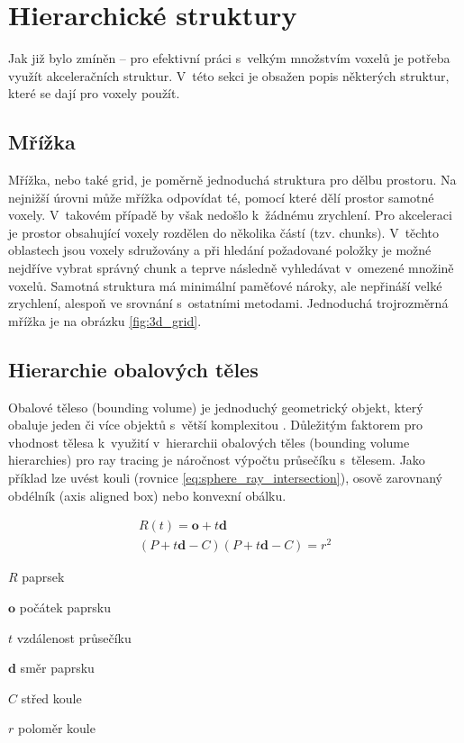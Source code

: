 \section{Hierarchické struktury}
Jak již bylo zmíněn -- pro efektivní práci s~velkým množstvím voxelů je potřeba využít akceleračních struktur. V~této sekci je obsažen popis některých struktur, které se dají pro voxely použít.

\subsection{Mřížka}
Mřížka, nebo také grid, je poměrně jednoduchá struktura pro dělbu prostoru. Na nejnižší úrovni může mřížka odpovídat té, pomocí které dělí prostor samotné voxely. V~takovém případě by však nedošlo k~žádnému zrychlení. Pro akceleraci je prostor obsahující voxely rozdělen do několika částí (tzv. chunks). V~těchto oblastech jsou voxely sdružovány a při hledání požadované položky je možné nejdříve vybrat správný chunk a teprve následně vyhledávat v~omezené množině voxelů. Samotná struktura má minimální paměťové nároky, ale nepřináší velké zrychlení, alespoň ve srovnání s~ostatními metodami. Jednoduchá trojrozměrná mřížka je na obrázku \ref{fig:3d_grid}.

\subsection{Hierarchie obalových těles} \label{sec:BVH}
Obalové těleso (bounding volume) je jednoduchý geometrický objekt, který obaluje jeden či více objektů s~větší komplexitou \cite{ericson_2005}. Důležitým faktorem pro vhodnost tělesa k~využití v~hierarchii obalových těles (bounding volume hierarchies) pro ray tracing je náročnost výpočtu průsečíku s~tělesem. Jako příklad lze uvést kouli (rovnice \ref{eq:sphere_ray_intersection}), osově zarovnaný obdélník (axis aligned box) nebo konvexní obálku.

\begin{equation} \label{eq:sphere_ray_intersection}
	\begin{gathered}
	    R(t) = \textbf{o} + t\textbf{d}  \\
	    
	    (P + t\textbf{d} - C) (P + t\textbf{d} - C) = r^2
	    
	\end{gathered}
\end{equation}

\begin{eqexpl}[60mm]
\item{$R$} paprsek
\item{$\textbf{o}$} počátek paprsku
\item{$t$} vzdálenost průsečíku
\item{$\textbf{d}$} směr paprsku
\item{$C$} střed koule
\item{$r$} poloměr koule
\end{eqexpl}

